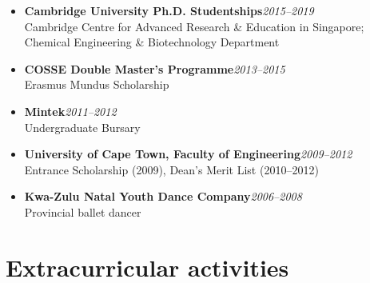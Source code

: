 \documentclass[11pt,a4paper,sans]{moderncv}   %
\def\addls{\vspace{2pt}}
\begin{document}
	\begin{itemize}
		
		\item{\textbf{Cambridge University Ph.D. Studentships}\hfill{\textit{2015--2019}}\\
			{Cambridge Centre for Advanced Research \& Education in Singapore; Chemical Engineering \& Biotechnology Department}} 
		
		\addls
		
		\item{\textbf{COSSE Double Master's Programme}\hfill{\textit{2013--2015}}\\
			{Erasmus Mundus Scholarship}} 
		
		\addls
		
		\item{\textbf{Mintek}\hfill\textit{{2011--2012}}\\
			{Undergraduate Bursary}} 
		
		\addls
		
		\item{\textbf{University of Cape Town, Faculty of Engineering}\hfill{\textit{2009--2012}}\\
			{Entrance Scholarship (2009), Dean's Merit List (2010--2012)}} 
		
		\addls
		
		\item{\textbf{Kwa-Zulu Natal Youth Dance Company}\hfill{\textit{2006--2008}}\\
			{Provincial ballet dancer}} 
		
	\end{itemize}
	
	\addls
	
	\section{Extracurricular activities}
	
\end{document}
